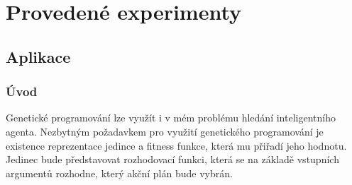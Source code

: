 



\chapter{Provedené experimenty}

\section{Aplikace}
\subsection{Úvod}
Genetické programování lze využít i v mém problému hledání inteligentního agenta. 
Nezbytným požadavkem pro využití genetického programování je existence reprezentace jedince a fitness funkce, která mu přiřadí jeho hodnotu. 
Jedinec bude představovat rozhodovací funkci, která se na základě vstupních argumentů rozhodne, který akční plán bude vybrán.

